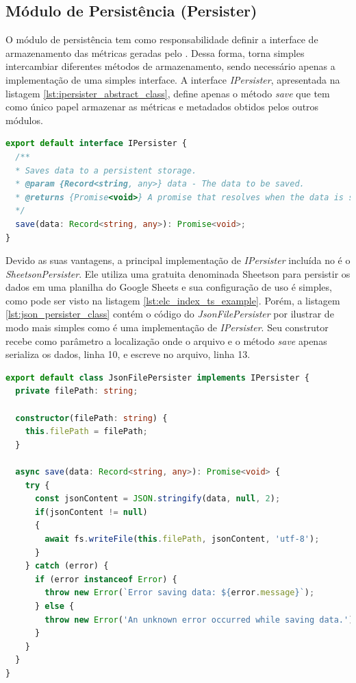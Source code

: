 \documentclass[12pt]{tcc}
\begin{document}
	\subsection{Módulo de Persistência (Persister)}
	\label{subsection:modulo-persister}

	O módulo de persistência tem como responsabilidade definir a interface de armazenamento das métricas geradas pelo .
	Dessa forma, torna simples intercambiar diferentes métodos de armazenamento, sendo necessário apenas a implementação de uma simples interface.
	A interface \emph{IPersister}, apresentada na listagem \ref{lst:ipersister_abstract_class}, define apenas o método \emph{save} que tem como único papel armazenar as métricas e metadados obtidos pelos outros módulos.

\begin{lstlisting}[label={lst:ipersister_abstract_class}, caption={Implementação da interface \emph{IPersister}.}, language=TypeScript, breaklines=true]
export default interface IPersister {
  /**
  * Saves data to a persistent storage.
  * @param {Record<string, any>} data - The data to be saved.
  * @returns {Promise<void>} A promise that resolves when the data is saved.
  */
  save(data: Record<string, any>): Promise<void>;
}
\end{lstlisting}

	Devido as suas vantagens, a principal implementação de \emph{IPersister} incluída no  é o \emph{SheetsonPersister}.
	Ele utiliza uma  gratuita denominada Sheetson para persistir os dados em uma planilha do Google Sheets e sua configuração de uso é simples, como pode ser visto na listagem \ref{lst:elc_index_ts_example}.
	Porém, a listagem \ref{lst:json_persister_class} contém o código do \emph{JsonFilePersister} por ilustrar de modo mais simples como é uma implementação de \emph{IPersister}.
	Seu construtor recebe como parâmetro a localização onde o arquivo  e o método \emph{save} apenas serializa os dados, linha 10, e escreve no arquivo, linha 13.


\begin{minipage}{\linewidth}
\begin{lstlisting}[label={lst:json_persister_class}, caption={[Fragmento de código da classe \emph{JsonFilePersister}.]Fragmento de código da classe \emph{JsonFilePersister} o qual implementa a camada de persistência para armazenar os resultado em um arquivo \acr{JSON}.}, language=TypeScript, breaklines=true]
export default class JsonFilePersister implements IPersister {
  private filePath: string;

  constructor(filePath: string) {
    this.filePath = filePath;
  }

  async save(data: Record<string, any>): Promise<void> {
    try {
      const jsonContent = JSON.stringify(data, null, 2);
      if(jsonContent != null)
      {
        await fs.writeFile(this.filePath, jsonContent, 'utf-8');
      }
    } catch (error) {
      if (error instanceof Error) {
        throw new Error(`Error saving data: ${error.message}`);
      } else {
        throw new Error('An unknown error occurred while saving data.');
      }
    }
  }
}
\end{lstlisting}
\end{minipage}
\end{document}
